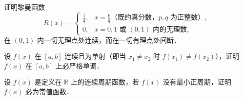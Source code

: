 \begin{xiti}
\item 证明黎曼函数
\[
R(x) = \begin{cases}
\frac{1}{q}, & x = \frac{p}{q} \text{（既约真分数，} p, q \text{ 为正整数）}, \\
0, & x = 0, 1 \text{ 或 } (0, 1) \text{ 内的无理数},
\end{cases}
\]
在 $(0, 1)$ 内一切无理点处连续，而在一切有理点处间断．

\item 设 $f(x)$ 在 $[a, b]$ 连续且为单射（即当 $x_1 \neq x_2$ 时 $f(x_1) \neq f(x_2)$），证明 $f(x)$ 在 $[a, b]$ 上必严格单调．

\item 设 $f(x)$ 是定义在 $\mathbb{R}$ 上的连续周期函数，若 $f(x)$ 没有最小正周期，证明 $f(x)$ 必为常值函数．
\end{xiti}
